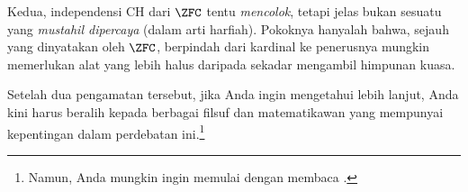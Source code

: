 \documentclass[../../../include/open-logic-section]{subfiles}
\begin{document}
Kedua, independensi CH dari $\ZFC$ tentu \emph{mencolok}, tetapi jelas bukan
sesuatu yang \emph{mustahil dipercaya} (dalam arti harfiah). Pokoknya hanyalah
bahwa, sejauh yang dinyatakan oleh $\ZFC$, berpindah dari kardinal ke
penerusnya mungkin memerlukan alat yang lebih halus daripada sekadar
mengambil himpunan kuasa.

Setelah dua pengamatan tersebut, jika Anda ingin mengetahui lebih lanjut,
Anda kini harus beralih kepada berbagai filsuf dan matematikawan yang
mempunyai kepentingan dalam perdebatan ini.\footnote{Namun, Anda mungkin ingin
memulai dengan membaca \citet[\S15.6]{Potter2004}.}
\end{document}
